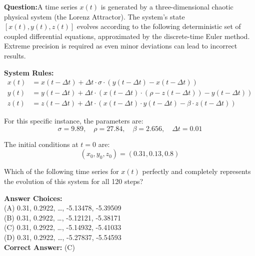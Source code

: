 
\begin{ReasoningBox}[title=Deductive Reasoning] %
    
        \textbf{Question:}A time series $x(t)$ is generated by a three-dimensional chaotic physical system (the Lorenz Attractor). The system's state $[x(t), y(t), z(t)]$ evolves according to the following deterministic set of coupled differential equations, approximated by the discrete-time Euler method. Extreme precision is required as even minor deviations can lead to incorrect results.

\vspace{0.5em}
\noindent \textbf{System Rules:}
\begin{align*}
    x(t) &= x(t-\Delta t) + \Delta t \cdot \sigma \cdot (y(t-\Delta t) - x(t-\Delta t)) \\
    y(t) &= y(t-\Delta t) + \Delta t \cdot (x(t-\Delta t) \cdot (\rho - z(t-\Delta t)) - y(t-\Delta t)) \\
    z(t) &= z(t-\Delta t) + \Delta t \cdot (x(t-\Delta t) \cdot y(t-\Delta t) - \beta \cdot z(t-\Delta t))
\end{align*}

\noindent For this specific instance, the parameters are:
\[
    \sigma = 9.89, \quad \rho = 27.84, \quad \beta = 2.656, \quad \Delta t = 0.01
\]

\noindent The initial conditions at $t=0$ are:
\[
    (x_0, y_0, z_0) = (0.31, 0.13, 0.8)
\]

\noindent Which of the following time series for $x(t)$ perfectly and completely represents the evolution of this system for all 120 steps?
    

    \vspace{0.5em}

    \textbf{Answer Choices:} \\(A) 0.31, 0.2922, \ldots, -5.13478, -5.39509 \\(B) 0.31, 0.2922, \ldots, -5.12121, -5.38171 \\(C) 0.31, 0.2922, \ldots, -5.14932, -5.41033 \\(D) 0.31, 0.2922, \ldots, -5.27837, -5.54593\\
    \textbf{Correct Answer:} \textcolor{correctgreen}{(C)} \\
\end{ReasoningBox}